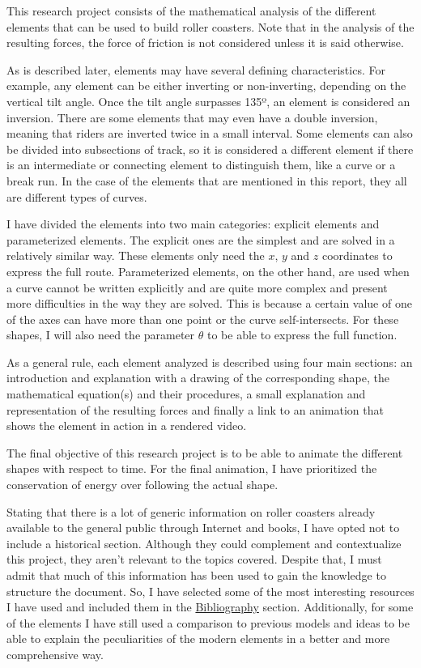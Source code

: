\documentclass[12pt,twoside,a4paper]{article}
\begin{document}
	This research project consists of the mathematical analysis of the different elements that can be used to build roller coasters. Note that in the analysis of the resulting forces, the force of friction is not considered unless it is said otherwise.
	
	As is described later, elements may have several defining characteristics. For example, any element can be either inverting or non-inverting, depending on the vertical tilt angle. Once the tilt angle surpasses 135º, an element is considered an inversion. There are some elements that may even have a double inversion, meaning that riders are inverted twice in a small interval. Some elements can also be divided into subsections of track, so it is considered a different element if there is an intermediate or connecting element to distinguish them, like a curve or a break run. In the case of the elements that are mentioned in this report, they all are different types of curves.
	
	I have divided the elements into two main categories: explicit elements and parameterized elements. The explicit ones are the simplest and are solved in a relatively similar way. These elements only need the $x$, $y$ and $z$ coordinates to express the full route. Parameterized elements, on the other hand, are used when a curve cannot be written explicitly and are quite more complex and present more difficulties in the way they are solved. This is because a certain value of one of the axes can have more than one point or the curve self-intersects. For these shapes, I will also need the parameter $\theta$ to be able to express the full function.
	
	As a general rule, each element analyzed is described using four main sections: an introduction and explanation with a drawing of the corresponding shape, the mathematical equation(s) and their procedures, a small explanation and representation of the resulting forces and finally a link to an animation that shows the element in action in a rendered video.
	
	The final objective of this research project is to be able to animate the different shapes with respect to time. For the final animation, I have prioritized the conservation of energy over following the actual shape.
	
	Stating that there is a lot of generic information on roller coasters already available to the general public through Internet and books, I have opted not to include a historical section. Although they could complement and contextualize this project, they aren't relevant to the topics covered. Despite that, I must admit that much of this information has been used to gain the knowledge to structure the document. So, I have selected some of the most interesting resources I have used and included them in the \hyperref[sec:Bibliography]{Bibliography} section. Additionally, for some of the elements I have still used a comparison to previous models and ideas to be able to explain the peculiarities of the modern elements in a better and more comprehensive way.
	
\end{document}

